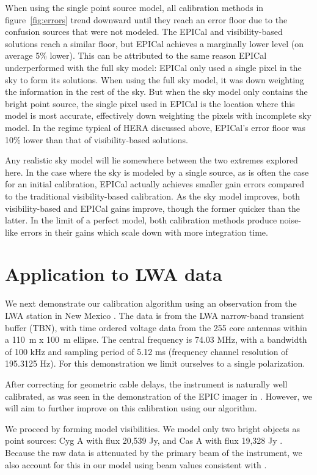 \documentclass[a4paper,fleqn,usenatbib]{mnras}
\begin{document}
When using the single point source model, all calibration methods in figure~\ref{fig:errors} trend 
downward until they reach an error floor due to the confusion sources that were not modeled. 
The EPICal and visibility-based solutions reach a similar floor, but EPICal achieves a 
marginally lower level (on average 5\% lower). This can be attributed to the same reason 
EPICal underperformed with the full sky model: EPICal only used a single pixel in the sky to 
form its solutions. When using the full sky model, it was down weighting the information in the 
rest of the sky. But when the sky model only contains the bright point source, the single pixel 
used in EPICal is the location where this model is most accurate, effectively down weighting 
the pixels with incomplete sky model. In the regime typical of HERA discussed above, EPICal's 
error floor was 10\% lower than that of visibility-based solutions.

Any realistic sky model will lie somewhere between the two extremes explored here. In the 
case where the sky is modeled by a single source, as is often the case for an initial calibration, 
EPICal actually achieves smaller gain errors compared to the traditional visibility-based 
calibration. As the sky model improves, both visibility-based and EPICal gains improve, though 
the former quicker than the latter. In the limit of a perfect model, both calibration methods 
produce noise-like errors in their gains which scale down with more integration time.

\section{Application to LWA data}\label{sec:data}
We next demonstrate our calibration algorithm using an observation from the LWA station in 
New Mexico \citep{ell13}. The data is from the LWA narrow-band transient buffer (TBN), with time ordered 
voltage data from the 255 core antennas within a 110~m x 100~m ellipse. 
The central frequency is 74.03 
MHz, with a bandwidth of 100 kHz and sampling period of 5.12 ms (frequency channel 
resolution of 195.3125 Hz). For this demonstration we limit ourselves to a single polarization.

After correcting for geometric cable delays, the instrument is naturally well calibrated, as was 
seen in the demonstration of the EPIC imager in \citealt{thy15c}. However, we will aim to 
further improve on this calibration using our algorithm.

We proceed by forming model visibilities. We model only two bright objects as point sources: 
Cyg A with flux 20,539 Jy, and Cas A with flux 19,328 Jy \citep{lan12}. 
Because the raw data is attenuated by the primary beam of the instrument, we also account for 
this in our model using beam values consistent with \cite{hic12}.
\end{document}
